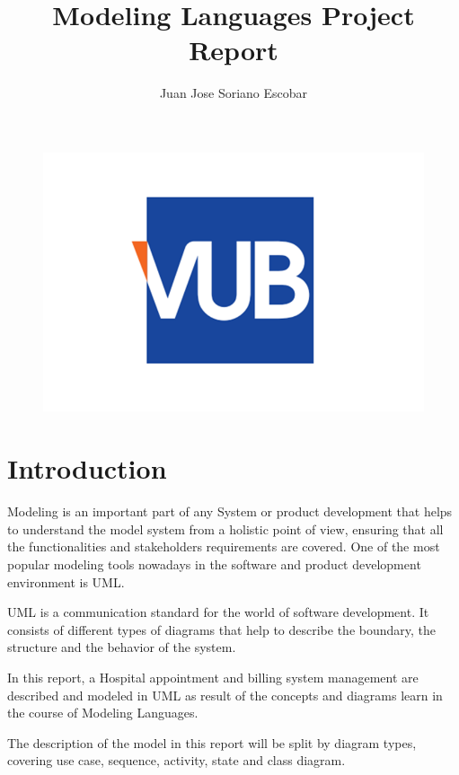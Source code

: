 \documentclass{article}
\begin{document}
        \begin{figure}
            \centering
            \includegraphics[width=0.5\linewidth]{./img/vub.png}
        \end{figure}
        \title{Modeling Languages Project Report}
        \author{Juan Jose Soriano Escobar }
        \maketitle
        \newpage

        \tableofcontents
        \newpage
    
        \begin{appendix}
            \listoffigures
          \end{appendix}
          \newpage
    
    
            \section{Introduction}

            Modeling is an important part of any System or product development that helps to understand the model system from a holistic point of view, ensuring that all the functionalities and
            stakeholders requirements are covered. One of the most popular modeling tools nowadays in the software and product development environment is UML.

            UML is a communication standard for the world of software development.  It consists of different types of diagrams that  help to describe the boundary, the structure 
            and the behavior of the system.

            In this report, a Hospital appointment and billing system management are described and modeled in UML as result of the concepts and diagrams learn in the course of Modeling Languages.

            The description of the model in this report will be split by diagram types, covering use case, sequence, activity, state and class diagram.
             
\end{document}
